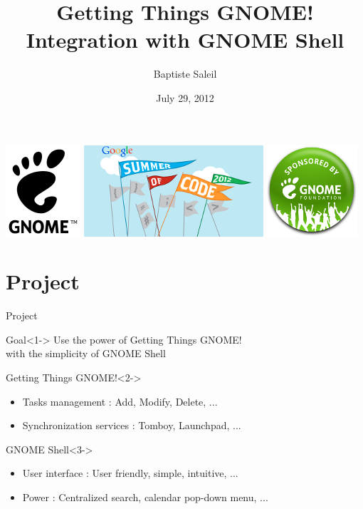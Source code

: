 \documentclass{beamer}
\title{ Getting Things GNOME! Integration with GNOME Shell}
\author{Baptiste Saleil}
\institute{}
\date{July 29, 2012}
\begin{document}
	\begin{frame}
		\titlepage
		\begin{center}
			\includegraphics[scale=0.5]{gnome.png}
			\hspace{1cm}
			\includegraphics[scale=0.4]{gsoc.png}
			\hspace{1cm}
			\includegraphics[scale=0.4]{sponsored.png}
		\end{center}
	\end{frame}

	\section{Project}
	\begin{frame}{Project}
		\begin{exampleblock}{Goal}<1->
			\centering Use the power of Getting Things GNOME! \\ with the simplicity of GNOME Shell 
		\end{exampleblock}
		\begin{block}{Getting Things GNOME!}<2->
			\begin{itemize}
				\item Tasks management : Add, Modify, Delete, ...
				\item Synchronization services : Tomboy, Launchpad, ...
			\end{itemize}
		\end{block}
		\begin{block}{GNOME Shell}<3->
			\begin{itemize}
				\item User interface : User friendly, simple, intuitive, ...
				\item Power : Centralized search, calendar pop-down menu, ...
			\end{itemize}
		\end{block}
	\end{frame}
	
\end{document}
